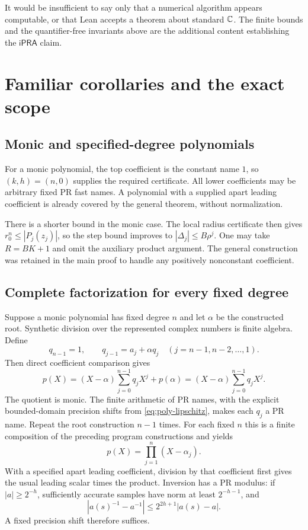 \documentclass[11pt,letterpaper]{article}
\theoremstyle{definition}\newtheorem{definition}[theorem]{Definition}
\theoremstyle{remark}\newtheorem{remark}[theorem]{Remark}
\newcommand{\ipra}{\mathsf{iPRA}}
\begin{document}
It would be insufficient to say only that a numerical algorithm appears
computable, or that Lean accepts a theorem about standard $\mathbb C$.
The finite bounds and the quantifier-free invariants above are the
additional content establishing the $\ipra$ claim.

\section{Familiar corollaries and the exact scope}
\label{sec:corollaries}

\subsection{Monic and specified-degree polynomials}

For a monic polynomial, the top coefficient is the constant name $1$, so
$(k,h)=(n,0)$ supplies the required certificate. All lower coefficients may
be arbitrary fixed PR fast names. A polynomial with a supplied apart
leading coefficient is already covered by the general theorem, without
normalization.

There is a shorter bound in the monic case. The local radius certificate
then gives $r_0^n\le|P_j(z_j)|$, so the step bound improves to
$|\Delta_j|\le B\rho^j$. One may take $R=BK+1$ and omit the auxiliary
product argument. The general construction was retained in the main proof
to handle any positively nonconstant coefficient.

\subsection{Complete factorization for every fixed degree}

Suppose a monic polynomial has fixed degree $n$ and let $\alpha$ be the
constructed root. Synthetic division over the represented complex numbers
is finite algebra. Define
\[
 q_{n-1}=1,\qquad q_{j-1}=a_j+\alpha q_j
       \quad(j=n-1,n-2,\ldots,1).
\]
Then direct coefficient comparison gives
\[
 p(X)=(X-\alpha)\sum_{j=0}^{n-1}q_jX^j+p(\alpha)
      =(X-\alpha)\sum_{j=0}^{n-1}q_jX^j.
\]
The quotient is monic. The finite arithmetic of PR names, with the explicit
bounded-domain precision shifts from \eqref{eq:poly-lipschitz}, makes each
$q_j$ a PR name. Repeat the root construction $n-1$ times. For each fixed
$n$ this is a finite composition of the preceding program constructions
and yields
\[
 p(X)=\prod_{j=1}^n(X-\alpha_j).
\]
With a specified apart leading coefficient, division by that coefficient
first gives the usual leading scalar times the product. Inversion has a
PR modulus: if $|a|\ge2^{-h}$, sufficiently accurate samples have norm
at least $2^{-h-1}$, and
\[
 |a(s)^{-1}-a^{-1}|\le2^{2h+1}|a(s)-a|.
\]
A fixed precision shift therefore suffices.
\end{document}
